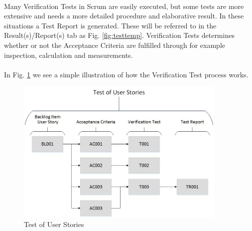 \\
Many Verification Tests in Scrum are easily executed, but some tests are more extensive and needs a more detailed procedure and elaborative result. In these situations a Test Report is generated. These will be referred to in the Result(s)/Report(s) tab as  Fig. \ref{fig:testtemp}. Verification Tests determines whether or not the Acceptance Criteria are fulfilled through for example inspection, calculation and measurements.\\ 
\\
In Fig. \ref{fig:testsetup} we see a simple illustration of how the Verification Test process works. 
\begin{figure}[h]
    \centering
        \includegraphics[width=0.9\textwidth]{VAPIQ-PICTURES/testdocbild}
        \caption{Test of User Stories}
        \label{fig:testsetup}
\end{figure}